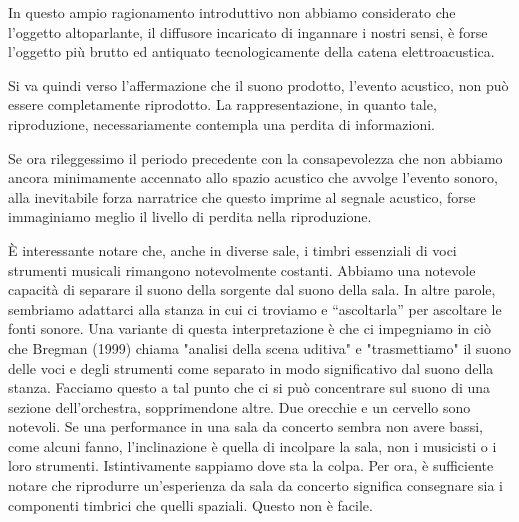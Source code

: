 In questo ampio ragionamento introduttivo non abbiamo considerato che l'oggetto
altoparlante, il diffusore incaricato di ingannare i nostri sensi, è forse
l'oggetto più brutto ed antiquato tecnologicamente della catena elettroacustica.


Si va quindi verso l'affermazione che il suono prodotto, l'evento acustico, non
può essere completamente riprodotto. La rappresentazione, in quanto tale,
riproduzione, necessariamente contempla una perdita di informazioni.

Se ora rileggessimo il periodo precedente con la consapevolezza che non abbiamo
ancora minimamente accennato allo spazio acustico che avvolge l'evento sonoro,
alla inevitabile forza narratrice che questo imprime al segnale acustico, forse
immaginiamo meglio il livello di perdita nella riproduzione.

È interessante notare che, anche in diverse sale, i timbri essenziali di voci
strumenti musicali rimangono notevolmente costanti. Abbiamo una notevole
capacità di separare il suono della sorgente dal suono della sala. In altre
parole, sembriamo adattarci alla stanza in cui ci troviamo e “ascoltarla” per
ascoltare le fonti sonore. Una variante di questa interpretazione è che ci
impegniamo in ciò che Bregman (1999) chiama "analisi della scena uditiva" e
"trasmettiamo" il suono delle voci e degli strumenti come separato in modo
significativo dal suono della stanza. Facciamo questo a tal punto che ci si può
concentrare sul suono di una sezione dell'orchestra, sopprimendone altre. Due
orecchie e un cervello sono notevoli. Se una performance in una sala da concerto
sembra non avere bassi, come alcuni fanno, l'inclinazione è quella di incolpare
la sala, non i musicisti o i loro strumenti. Istintivamente sappiamo dove sta
la colpa. Per ora, è sufficiente notare che riprodurre un'esperienza da sala da
concerto significa consegnare sia i componenti timbrici che quelli spaziali.
Questo non è facile.

